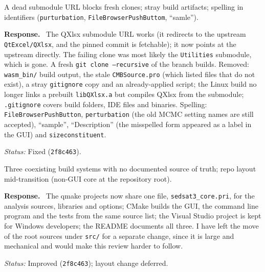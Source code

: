 \documentclass[11pt]{article}
\newcommand{\code}[1]{\texttt{#1}}
\newcommand{\commit}[1]{\texttt{#1}}
\newcounter{cmt}
\newcounter{grp}
\renewcommand{\thecmt}{\thegrp.\arabic{cmt}}
\newenvironment{reviewer}[1]{%
  \refstepcounter{cmt}%
  \begin{tcolorbox}[enhanced,breakable,colback=commentbg,colframe=usgsgreen!60,
    boxrule=0.4pt,left=6pt,right=6pt,top=4pt,bottom=4pt,
    title={\small\textbf{Comment \thecmt}\hfill\textit{#1}},
    coltitle=black,colbacktitle=usgsgreen!15,fonttitle=\small]}%
  {\end{tcolorbox}}
\newenvironment{response}{\par\noindent\textbf{Response.}\ }{\par\medskip}
\newcommand{\status}[1]{\par\noindent\textit{Status:} #1\par}
\begin{document}
\begin{reviewer}{Email 10/15, item 6; Summary}
A dead submodule URL blocks fresh clones; stray build artifacts; spelling in
identifiers (\code{purturbation}, \code{FileBrowserPushButtom}, ``samle'').
\end{reviewer}
\begin{response}
The QXlsx submodule URL works (it redirects to the upstream
\code{QtExcel/\allowbreak{}QXlsx}, and the pinned commit is fetchable); it now points at
the upstream directly. The failing clone was most likely the
\code{Utilities} submodule, which is gone. A fresh
\code{git clone --recursive} of the branch builds. Removed: \code{wasm\_\allowbreak{}bin/\allowbreak{}}
build output, the stale \code{CMBSource.\allowbreak{}pro} (which listed files that do not
exist), a stray \code{gitignore} copy and an already-applied script; the
Linux build no longer links a prebuilt \code{libQXlsx.\allowbreak{}a} but compiles QXlsx
from the submodule; \code{.\allowbreak{}gitignore} covers build folders, IDE files and
binaries. Spelling: \code{FileBrowserPushButton}, \code{perturbation} (the
old MCMC setting names are still accepted), ``sample'', ``Description''
(the misspelled form appeared as a label in the GUI) and
\code{sizeconstituent}.
\end{response}
\status{Fixed (\commit{2f8c463}).}

\begin{reviewer}{Summary, optional / polish}
Three coexisting build systems with no documented source of truth; repo
layout mid-transition (non-GUI core at the repository root).
\end{reviewer}
\begin{response}
The qmake projects now share one file, \code{sedsat3\_\allowbreak{}core.\allowbreak{}pri}, for the
analysis sources, libraries and options; CMake builds the GUI, the command
line program and the tests from the same source list; the Visual Studio
project is kept for Windows developers; the README documents all three. I
have left the move of the root sources under \code{src/\allowbreak{}} for a separate
change, since it is large and mechanical and would make this review harder
to follow.
\end{response}
\status{Improved (\commit{2f8c463}); layout change deferred.}
\end{document}
